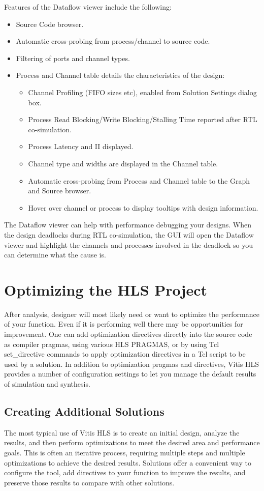 Features of the Dataflow viewer include the following:
\begin{itemize}
  \item Source Code browser.
  \item Automatic cross-probing from process/channel to source code.
  \item Filtering of ports and channel types.
  \item Process and Channel table details the characteristics of the design: 
  \begin{itemize}
    \item Channel Profiling (FIFO sizes etc), enabled from Solution Settings dialog box.
    \item Process Read Blocking/Write Blocking/Stalling Time reported after RTL co-simulation.
    \item Process Latency and II displayed.
    \item Channel type and widths are displayed in the Channel table.
    \item Automatic cross-probing from Process and Channel table to the Graph and Source browser.
    \item Hover over channel or process to display tooltips with design information.
  \end{itemize}
\end{itemize}

The Dataflow viewer can help with performance debugging your designs. When the design deadlocks during RTL co-simulation, the GUI will open the Dataflow viewer and highlight the channels and processes involved in the deadlock so you can determine what the cause is.


\clearpage
\section{Optimizing the HLS Project}
After analysis, designer will most likely need or want to optimize the performance of your function. Even if it is performing well there may be opportunities for improvement. One can add optimization directives directly into the source code as compiler pragmas, using various HLS PRAGMAS, or by using Tcl set\_directive commands to apply optimization directives in a Tcl script to be used by a solution. In addition to optimization pragmas and directives, Vitis HLS provides a number of configuration settings to let you manage the default results of simulation and synthesis. 

\subsection{Creating Additional Solutions}
The most typical use of Vitis HLS is to create an initial design, analyze the results, and then perform optimizations to meet the desired area and performance goals. This is often an iterative process, requiring multiple steps and multiple optimizations to achieve the desired results. Solutions offer a convenient way to configure the tool, add directives to your function to improve the results, and preserve those results to compare with other solutions.

